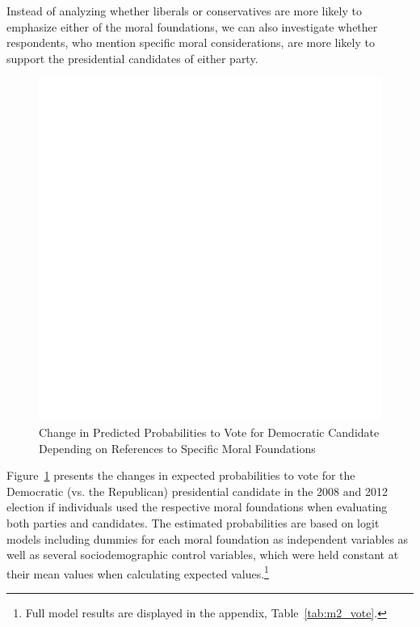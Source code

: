 \documentclass[12pt]{article}
\begin{document}
Instead of analyzing whether liberals or conservatives are more likely to emphasize either of the moral foundations, we can also investigate whether respondents, who mention specific moral considerations, are more likely to support the presidential candidates of either party. 

\begin{figure}[ht]\centering
\includegraphics[scale=.6]{../calc/fig/m2_vote.pdf}
\caption{Change in Predicted Probabilities to Vote for Democratic Candidate Depending on References to Specific Moral Foundations}\label{fig:m2_vote}
\end{figure}

Figure~\ref{fig:m2_vote} presents the changes in expected probabilities to vote for the Democratic (vs. the Republican) presidential candidate in the 2008 and 2012 election if individuals used the respective moral foundations when evaluating both parties and candidates. The estimated probabilities are based on logit models including dummies for each moral foundation as independent variables as well as several sociodemographic control variables, which were held constant at their mean values when calculating expected values.\footnote{Full model results are displayed in the appendix, Table~\ref{tab:m2_vote}.}
\end{document}
